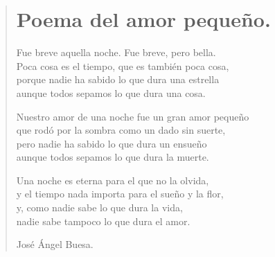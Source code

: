 \documentclass[11pt, portrait, twoside, notitlepage, openright]{book}
\begin{document}
\newpage
\begin{verse}
\begin{center}
\section{Poema del amor pequeño.}
\end{center}
Fue breve aquella noche. Fue breve, pero bella.\\
Poca cosa es el tiempo, que es también poca cosa,\\
porque nadie ha sabido lo que dura una estrella\\
aunque todos sepamos lo que dura una cosa.
\newline

Nuestro amor de una noche fue un gran amor pequeño\\
que rodó por la sombra como un dado sin suerte,\\
pero nadie ha sabido lo que dura un ensueño\\
aunque todos sepamos lo que dura la muerte.
\newline

Una noche es eterna para el que no la olvida,\\
y el tiempo nada importa para el sueño y la flor,\\
y, como nadie sabe lo que dura la vida,\\
nadie sabe tampoco lo que dura el amor.
\newline

José Ángel Buesa.
\end{verse}
\end{document}
